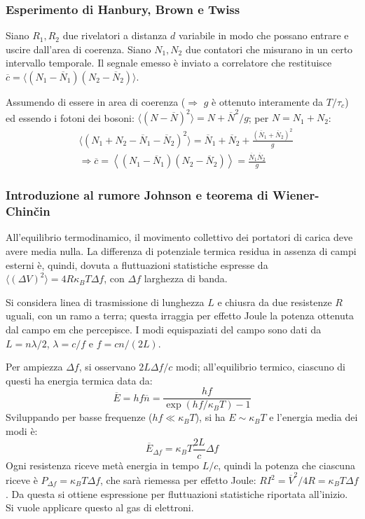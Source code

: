 \documentclass[10pt, a4paper]{scrartcl}
\numberwithin{equation}{subsection}
\theoremstyle{style1}
\theoremstyle{style2}
\begin{document}
\subsubsection{Esperimento di Hanbury, Brown e Twiss}
Siano $R_{1},R_2$ due rivelatori a distanza $d$ variabile in modo che possano entrare e uscire dall'area di coerenza.
Siano $N_1,N_2$ due contatori che misurano in un certo intervallo temporale.
Il segnale emesso \`e inviato a correlatore che restituisce $\overline{c} = \langle (N_1-\overline{N}_1)(N_2-\overline{N}_2) \rangle$.

Assumendo di essere in area di coerenza ($\Rightarrow $ $g$ \`e ottenuto interamente da $T / \tau _c$) ed essendo i fotoni dei bosoni: $\langle (N - \overline{N})^2 \rangle= N + \overline{N}^2 / g$; per $N = N_1+N_2$:
\[
\begin{split}
	&\big\langle (N_1+N_2 - \overline{N}_1 - \overline{N}_2)^2 \big\rangle = \overline{N}_1 + \overline{N}_2 + \frac{(\overline{N}_1 + \overline{N}_2)^2}{g}\\
	&\Rightarrow \overline{c} = \left\langle (N_1-\overline{N}_1) (N_2 - \overline{N}_2) \right\rangle = \frac{\overline{N}_1 \overline{N}_2}{g}
\end{split}
\] 
\subsubsection{Introduzione al rumore Johnson e teorema di Wiener-Chin\v cin}

All'equilibrio termodinamico, il movimento collettivo dei portatori di carica deve avere media nulla.
La differenza di potenziale termica residua in assenza di campi esterni \`e, quindi, dovuta a fluttuazioni statistiche espresse da $\langle (\Delta V)^2 \rangle = 4 R \kappa _B T \Delta f$, con $\Delta f$ larghezza di banda.

Si considera linea di trasmissione di lunghezza $L$ e chiusra da due resistenze $R $ uguali, con un ramo a terra; 
questa irraggia per effetto Joule la potenza ottenuta dal campo em che percepisce. 
I modi equispaziati del campo sono dati da $L = n \lambda  / 2$, $\lambda  = c / f$ e $f = c n / (2L)$.

Per ampiezza $\Delta f$, si osservano $2L \Delta f / c$ modi; all'equilibrio termico, ciascuno di questi ha energia termica data da:
\begin{equation}
	\overline{E} = h f \overline{n}= \frac{hf}{\exp(hf / \kappa _B T) -1 }
\end{equation}
Sviluppando per basse frequenze ($hf \ll\kappa _B T$), si ha $E \sim \kappa _B T$ e l'energia media dei modi \`e:
\begin{equation}
	\overline{E}_{\Delta f}  = \kappa _B T \frac{2L}{c}\Delta f
\end{equation}
Ogni resistenza riceve met\`a energia in tempo $L / c$, quindi la potenza che ciascuna riceve \`e $P_{\Delta f} = \kappa _B T \Delta f$,
che sar\`a riemessa per effetto Joule: $RI^2 = \overline{V}^2 / 4R = \kappa _B T \Delta f$. 
Da questa si ottiene espressione per fluttuazioni statistiche riportata all'inizio.	
Si vuole applicare questo al gas di elettroni.
\end{document}
